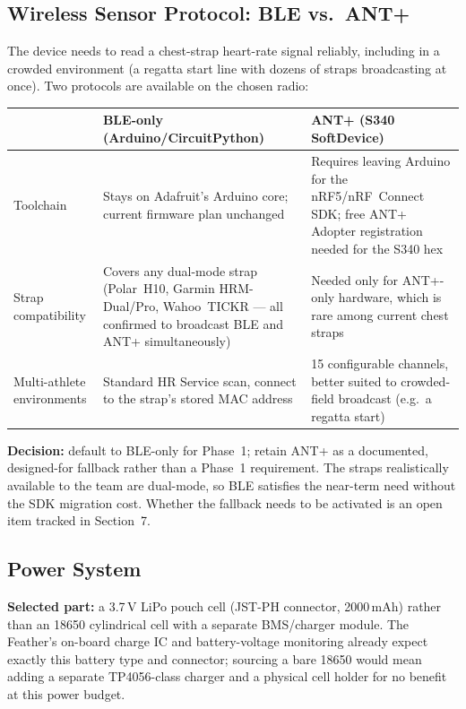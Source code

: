 \documentclass[11pt]{article}
\begin{document}
\subsection{Wireless Sensor Protocol: BLE vs.\ ANT+}
The device needs to read a chest-strap heart-rate signal reliably, including in a crowded environment (a regatta start line with dozens of straps broadcasting at once). Two protocols are available on the chosen radio:

\begin{center}
\begin{tabular}{L{3.6cm} L{5.6cm} L{5.6cm}}
\toprule
 & \textbf{BLE-only (Arduino/CircuitPython)} & \textbf{ANT+ (S340 SoftDevice)} \\
\midrule
Toolchain & Stays on Adafruit's Arduino core; current firmware plan unchanged & Requires leaving Arduino for the nRF5/nRF~Connect SDK; free ANT+ Adopter registration needed for the S340 hex \\
Strap compatibility & Covers any dual-mode strap (Polar~H10, Garmin HRM-Dual/Pro, Wahoo~TICKR --- all confirmed to broadcast BLE and ANT+ simultaneously) & Needed only for ANT+-only hardware, which is rare among current chest straps \\
Multi-athlete environments & Standard HR Service scan, connect to the strap's stored MAC address & 15 configurable channels, better suited to crowded-field broadcast (e.g.\ a regatta start) \\
\bottomrule
\end{tabular}
\end{center}

\textbf{Decision:} default to BLE-only for Phase~1; retain ANT+ as a documented, designed-for fallback rather than a Phase~1 requirement. The straps realistically available to the team are dual-mode, so BLE satisfies the near-term need without the SDK migration cost. Whether the fallback needs to be activated is an open item tracked in Section~7.

\subsection{Power System}
\textbf{Selected part:} a 3.7\,V LiPo pouch cell (JST-PH connector, 2000\,mAh) rather than an 18650 cylindrical cell with a separate BMS/charger module. The Feather's on-board charge IC and battery-voltage monitoring already expect exactly this battery type and connector; sourcing a bare 18650 would mean adding a separate TP4056-class charger and a physical cell holder for no benefit at this power budget.
\end{document}
